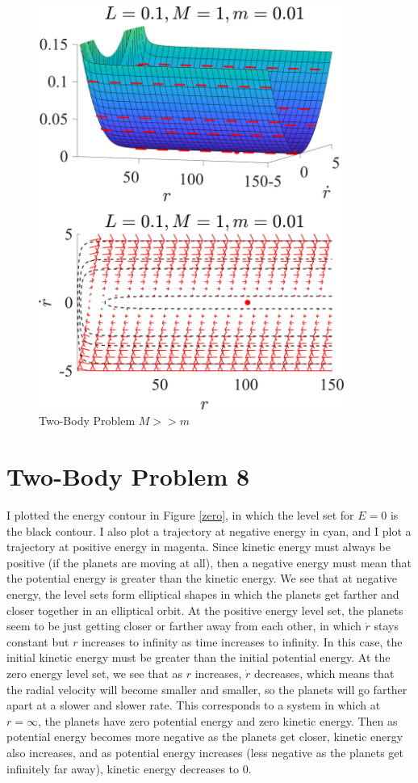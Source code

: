 \documentclass[11pt]{article}
\begin{document}
\begin{figure}[h]
\centering
\includegraphics[width=10cm]{2 Body Problem Unequal Masses.png}
\caption{Two-Body Problem $M >> m$}
\label{twoUneqM}
\end{figure}

\clearpage

\section*{Two-Body Problem 8}
I plotted the energy contour in Figure \ref{zero}, in which the level set for $E = 0$ is the black contour. I also plot a trajectory at negative energy in cyan, and I plot a trajectory at positive energy in magenta. Since kinetic energy must always be positive (if the planets are moving at all), then a negative energy must mean that the potential energy is greater than the kinetic energy. We see that at negative energy, the level sets form elliptical shapes in which the planets get farther and closer together in an elliptical orbit. At the positive energy level set, the planets seem to be just getting closer or farther away from each other, in which $\dot r$ stays constant but $r$ increases to infinity as time increases to infinity. In this case, the initial kinetic energy must be greater than the initial potential energy. At the zero energy level set, we see that as $r$ increases, $\dot r$ decreases, which means that the radial velocity will become smaller and smaller, so the planets will go farther apart at a slower and slower rate. This corresponds to a system in which at $r = \infty$, the planets have zero potential energy and zero kinetic energy. Then as potential energy becomes more negative as the planets get closer, kinetic energy also increases, and as potential energy increases (less negative as the planets get infinitely far away), kinetic energy decreases to 0.
\end{document}
